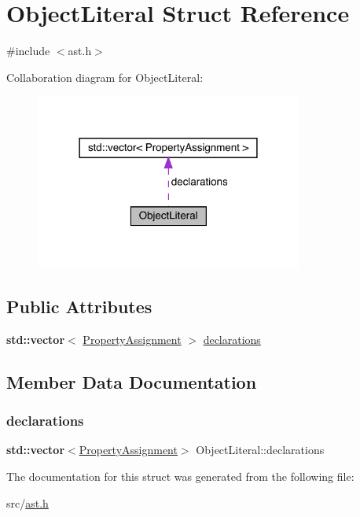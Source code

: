 \hypertarget{struct_object_literal}{}\section{Object\+Literal Struct Reference}
\label{struct_object_literal}


{\ttfamily \#include $<$ast.\+h$>$}



Collaboration diagram for Object\+Literal\+:\nopagebreak
\begin{figure}[H]
\begin{center}
\leavevmode
\includegraphics[width=249pt]{struct_object_literal__coll__graph}
\end{center}
\end{figure}
\subsection*{Public Attributes}
\begin{DoxyCompactItemize}
\item 
\textbf{ std\+::vector}$<$ \hyperlink{struct_property_assignment}{Property\+Assignment} $>$ \hyperlink{struct_object_literal_aafbf3e7ed74f3e6d2eb04d612ff6d0d4}{declarations}
\end{DoxyCompactItemize}


\subsection{Member Data Documentation}
\mbox{\label{struct_object_literal_aafbf3e7ed74f3e6d2eb04d612ff6d0d4}} 
\subsubsection{\texorpdfstring{declarations}{declarations}}
{\footnotesize\ttfamily \textbf{ std\+::vector}$<$\hyperlink{struct_property_assignment}{Property\+Assignment}$>$ Object\+Literal\+::declarations}



The documentation for this struct was generated from the following file\+:\begin{DoxyCompactItemize}
\item 
src/\hyperlink{ast_8h}{ast.\+h}\end{DoxyCompactItemize}
